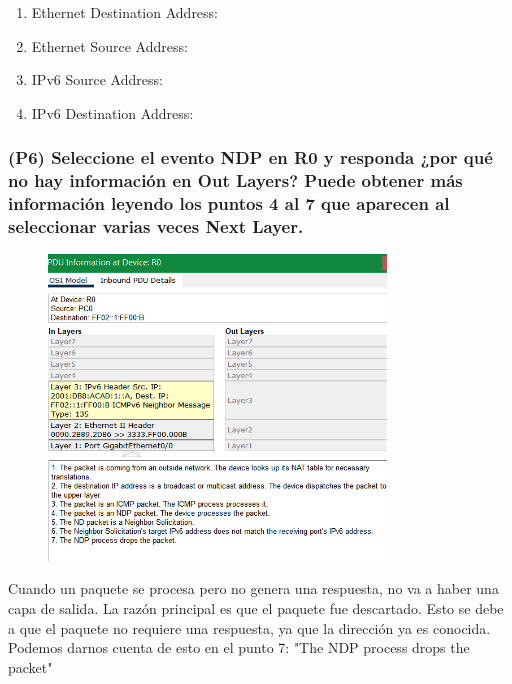 \documentclass{article}
\begin{document}
\begin{enumerate}
\item Ethernet Destination Address: 
\item Ethernet Source Address: 
\item IPv6 Source Address: 
\item IPv6 Destination Address: 
\end{enumerate}

\subsubsection*{(P6) Seleccione el evento NDP en R0 y responda ¿por qué no hay información en Out Layers? Puede obtener más información leyendo los puntos 4 al 7 que aparecen al seleccionar varias veces Next Layer.}
\begin{figure}[h]
    \centering
    \includegraphics[width=0.8\textwidth]{18.png}
\end{figure}

Cuando un paquete se procesa pero no genera una respuesta, no va a haber una capa de salida. La razón principal es que el paquete fue descartado. Esto se debe a que el paquete no requiere una respuesta, ya que la dirección ya es conocida. Podemos darnos cuenta de esto en el punto 7: "The NDP process drops the packet"
\end{document}
